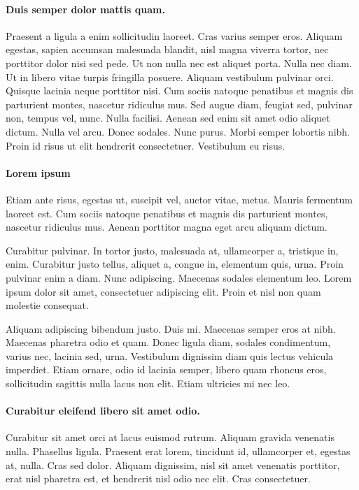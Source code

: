 \paragraph*{Duis semper dolor mattis quam.}
Praesent a ligula a enim sollicitudin laoreet. Cras varius semper eros. Aliquam egestas, sapien accumsan malesuada blandit, nisl magna viverra tortor, nec porttitor dolor nisi sed pede. Ut non nulla nec est aliquet porta. Nulla nec diam. Ut in libero vitae turpis fringilla posuere. Aliquam vestibulum pulvinar orci. Quisque lacinia neque porttitor nisi. Cum sociis natoque penatibus et magnis dis parturient montes, nascetur ridiculus mus. Sed augue diam, feugiat sed, pulvinar non, tempus vel, nunc. Nulla facilisi. Aenean sed enim sit amet odio aliquet dictum. Nulla vel arcu. Donec sodales. Nunc purus. Morbi semper lobortis nibh. Proin id risus ut elit hendrerit consectetuer. Vestibulum eu risus.

\paragraph*{Lorem ipsum}
Etiam ante risus, egestas ut, suscipit vel, auctor vitae, metus. Mauris fermentum laoreet est. Cum sociis natoque penatibus et magnis dis parturient montes, nascetur ridiculus mus. Aenean porttitor magna eget arcu aliquam dictum. 

Curabitur pulvinar. In tortor justo, malesuada at, ullamcorper a, tristique in, enim. Curabitur justo tellus, aliquet a, congue in, elementum quis, urna. Proin pulvinar enim a diam. Nunc adipiscing. Maecenas sodales elementum leo. Lorem ipsum dolor sit amet, consectetuer adipiscing elit. Proin et nisl non quam molestie consequat. 

Aliquam adipiscing bibendum justo. Duis mi. Maecenas semper eros at nibh. Maecenas pharetra odio et quam. Donec ligula diam, sodales condimentum, varius nec, lacinia sed, urna. Vestibulum dignissim diam quis lectus vehicula imperdiet. Etiam ornare, odio id lacinia semper, libero quam rhoncus eros, sollicitudin sagittis nulla lacus non elit. Etiam ultricies mi nec leo. 

\paragraph*{Curabitur eleifend libero sit amet odio.}
Curabitur sit amet orci at lacus euismod rutrum. Aliquam gravida venenatis nulla. Phasellus ligula. Praesent erat lorem, tincidunt id, ullamcorper et, egestas at, nulla. Cras sed dolor. Aliquam dignissim, nisl sit amet venenatis porttitor, erat nisl pharetra est, et hendrerit nisl odio nec elit. Cras consectetuer.


